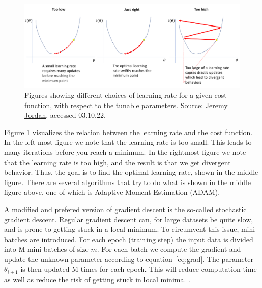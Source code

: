 \begin{figure}[h!]
    \includegraphics[width=\linewidth]{Figures/Machinelearning/lr_choice.png}
    \caption[Explaining concequence of choice of learning rate]{Figures showing different choices of learning rate for a given cost function, with respect to the tunable parameters. 
    Source: \href{https://www.jeremyjordan.me/content/images/2018/02/Screen-Shot-2018-02-24-at-11.47.09-AM.png}{Jeremy Jordan}, accessed 03.10.22.}
    \label{fig:lr_choice}
\end{figure}

Figure \ref{fig:lr_choice} visualizes the relation between the learning rate and the cost function. 
In the left most figure we note that the learning rate is too small. This leads to many iterations 
before you reach a minimum. In the rightmost figure we note that the learning rate is too high, 
and the result is that we get divergent behavior. Thus, the goal is to find the optimal learning 
rate, shown in the middle figure. There are several algorithms that try to do what is shown in 
the middle figure above, one of which is Adaptive Moment Estimation (ADAM)\cite{ADAM:opti}.\par 
A modified and prefered version of gradient descent is the so-called stochastic gradient descent.
Regular gradient descent can, for large datasets be quite slow, and is prone to getting stuck 
in a local minimum. To circumvent this issue, mini batches are introduced. For each epoch (training step) 
the input data is divided into M mini batches of size $m$. For each batch we compute the gradient and update the 
unknown parameter according to equation \ref{eq:grad}. The parameter $\theta_{i+1}$ is then updated M times for each epoch. 
This will reduce computation time as well as reduce the risk of getting stuck in local minima. \cite{FYSSTK}.




